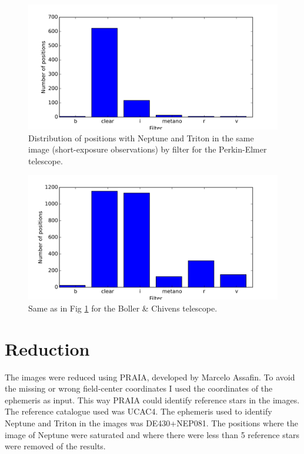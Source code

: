 \documentclass[12pt,a4paper]{report}
\newcommand{\PE}{Perkin-Elmer }
\newcommand{\BC}{Boller \& Chivens }
\begin{document}
\begin{figure}[H]
\includegraphics[width=16.0cm]{filtro_160.png} 
\caption{Distribution of positions with Neptune and Triton in the same image (short-exposure observations) by filter for the \PE telescope.}
\label{Fig:filtro-160}
\end{figure}

\begin{figure}[H]
\includegraphics[width=16.0cm]{filtro_IAG.png} 
\caption{Same as in Fig \ref{Fig:filtro-160} for the \BC telescope.}
\label{Fig:filtro-IAG}
\end{figure}



\section*{Reduction}

The images were reduced using PRAIA, developed by Marcelo Assafin. To avoid the missing or wrong field-center coordinates I used the coordinates of the ephemeris as input. This way PRAIA could identify reference stars in the images. The reference catalogue used was UCAC4. The ephemeris used to identify Neptune and Triton in the images was DE430+NEP081. The positions where the image of Neptune were saturated and where there were less than 5 reference stars were removed of the results.
\end{document}
